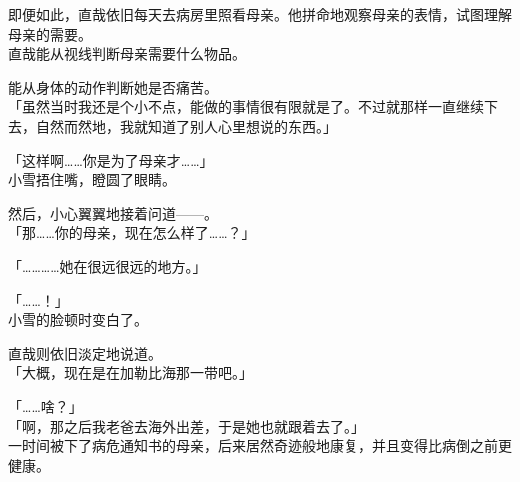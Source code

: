 即便如此，直哉依旧每天去病房里照看母亲。他拼命地观察母亲的表情，试图理解母亲的需要。\\

直哉能从视线判断母亲需要什么物品。

能从身体的动作判断她是否痛苦。\\

「虽然当时我还是个小不点，能做的事情很有限就是了。不过就那样一直继续下去，自然而然地，我就知道了别人心里想说的东西。」

「这样啊……你是为了母亲才……」\\

小雪捂住嘴，瞪圆了眼睛。

然后，小心翼翼地接着问道——。\\

「那……你的母亲，现在怎么样了……？」

「…………她在很远很远的地方。」

「……！」\\

小雪的脸顿时变白了。

直哉则依旧淡定地说道。\\

「大概，现在是在加勒比海那一带吧。」

「……啥？」\\

「啊，那之后我老爸去海外出差，于是她也就跟着去了。」\\

一时间被下了病危通知书的母亲，后来居然奇迹般地康复，并且变得比病倒之前更健康。

